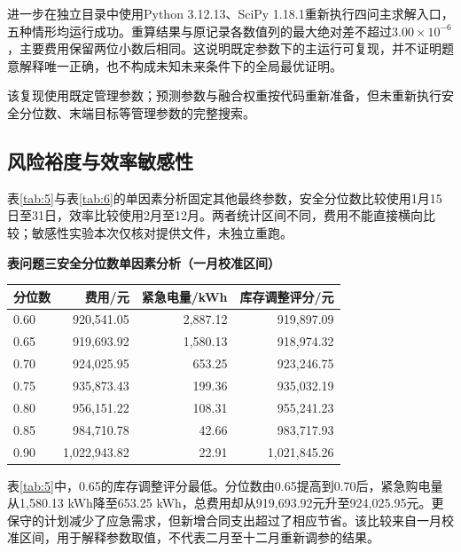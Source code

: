 \documentclass[12pt,a4paper]{ctexart}
\newcommand{\papertable}[1]{\refstepcounter{table}\label{tab:\thetable}\textbf{表\thetable\quad #1}}
\begin{document}
进一步在独立目录中使用Python 3.12.13、SciPy 1.18.1重新执行四问主求解入口，五种情形均运行成功。重算结果与原记录各数值列的最大绝对差不超过$3.00\times10^{-6}$，主要费用保留两位小数后相同。这说明既定参数下的主运行可复现，并不证明题意解释唯一正确，也不构成未知未来条件下的全局最优证明。

该复现使用既定管理参数；预测参数与融合权重按代码重新准备，但未重新执行安全分位数、末端目标等管理参数的完整搜索。

\subsection{风险裕度与效率敏感性}
表\ref{tab:5}与表\ref{tab:6}的单因素分析固定其他最终参数，安全分位数比较使用1月15日至31日，效率比较使用2月至12月。两者统计区间不同，费用不能直接横向比较；敏感性实验本次仅核对提供文件，未独立重跑。


\par\addvspace{5pt}\noindent\begin{minipage}{\linewidth}\centering
\small
\papertable{问题三安全分位数单因素分析（一月校准区间）}\par\vspace{4pt}
\begin{tabular}{lrrr}
\toprule
分位数 & 费用/元 & 紧急电量/kWh & 库存调整评分/元 \\
\midrule
0.60 & 920,541.05 & 2,887.12 & 919,897.09 \\
0.65 & 919,693.92 & 1,580.13 & 918,974.32 \\
0.70 & 924,025.95 & 653.25 & 923,246.75 \\
0.75 & 935,873.43 & 199.36 & 935,032.19 \\
0.80 & 956,151.22 & 108.31 & 955,241.23 \\
0.85 & 984,710.78 & 42.66 & 983,717.93 \\
0.90 & 1,022,943.82 & 22.91 & 1,021,845.26 \\
\bottomrule
\end{tabular}
\end{minipage}\par\addvspace{5pt}

表\ref{tab:5}中，0.65的库存调整评分最低。分位数由0.65提高到0.70后，紧急购电量从1,580.13 kWh降至653.25 kWh，总费用却从919,693.92元升至924,025.95元。更保守的计划减少了应急需求，但新增合同支出超过了相应节省。该比较来自一月校准区间，用于解释参数取值，不代表二月至十二月重新调参的结果。
\end{document}
